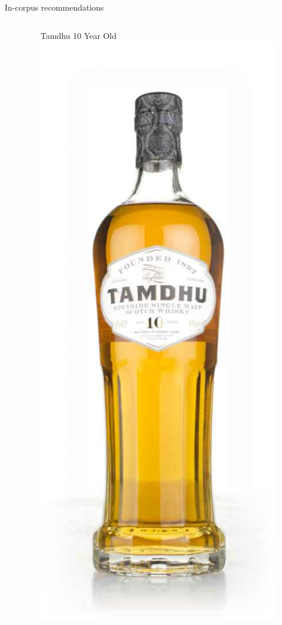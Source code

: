 \documentclass{beamer}
\begin{document}
\begin{frame}{In-corpus recommendations}
\begin{columns}
\begin{column}{0.5\textwidth}
		\end{column}
		\begin{column}{0.5\textwidth}
			\begin{figure}
				\begin{center}
					Tamdhu 10 Year Old
					\includegraphics[scale = 0.2]{tamdhu10}
				\end{center}
			\end{figure}
		\end{column}
	\end{columns}
	
	
	
\end{frame}
\end{document}
